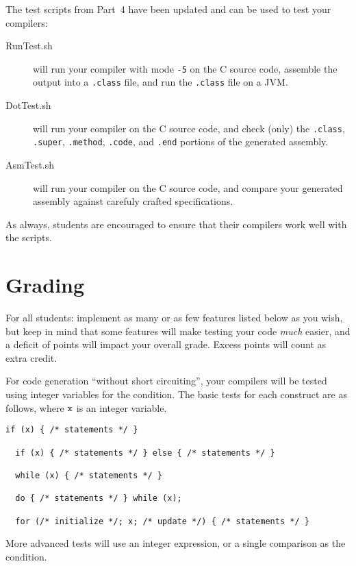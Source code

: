 \documentclass{article}
\newcommand{\codegen}{4}
\newcommand{\flowgen}{5}
\begin{document}
The test scripts from Part~\codegen{} have been updated and
can be used to test your compilers:
\begin{description}
    \item[RunTest.sh]
      will run your compiler with mode {\tt -\flowgen{}}
      on the C source code,
      assemble the output into a {\tt .class} file,
      and run the {\tt .class} file on a JVM.

    \item[DotTest.sh]
      will run your compiler on the C source code,
      and check (only) the {\tt .class}, {\tt .super}, {\tt .method},
      {\tt .code}, and {\tt .end} portions of the generated assembly.

    \item[AsmTest.sh]
      will run your compiler on the C source code,
      and compare your generated assembly against
      carefuly crafted specifications.
\end{description}
As always, students are encouraged to ensure that their compilers
work well with the scripts.

\section{Grading} \label{SEC:grading}

For all students: implement as many or as few features listed below as you wish,
but keep in mind that some features will make testing your code \emph{much}
easier, and a deficit of points will impact your overall grade.
Excess points will count as extra credit.

For code generation ``without short circuiting'',
your compilers will be tested using integer variables
for the condition.
The basic tests for each construct are as follows,
where ${\tt x}$ is an integer variable.
\begin{lstlisting}[numbers=none]
  if (x) { /* statements */ }

  if (x) { /* statements */ } else { /* statements */ }

  while (x) { /* statements */ }

  do { /* statements */ } while (x);

  for (/* initialize */; x; /* update */) { /* statements */ }
\end{lstlisting}
More advanced tests will use an integer expression,
or a single comparison as the condition.
\end{document}
